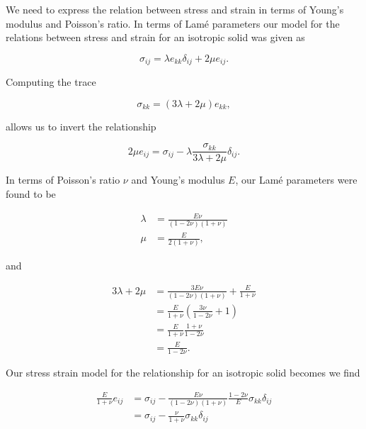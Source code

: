 We need to express the relation between stress and strain in terms of Young's modulus and Poisson's ratio.  In terms of Lam\'e parameters our model for the relations between stress and strain for an isotropic solid was given as

\begin{equation}\label{eqn:continuumProblemSet1:110}
\sigma_{ij} = \lambda e_{kk} \delta_{ij} + 2 \mu e_{ij}.
\end{equation}

Computing the trace

\begin{equation}\label{eqn:continuumProblemSet1:130}
\sigma_{kk} = (3 \lambda + 2 \mu) e_{kk},
\end{equation}

allows us to invert the relationship

\begin{equation}\label{eqn:continuumProblemSet1:150}
2 \mu e_{ij} = \sigma_{ij} - \lambda \frac{\sigma_{kk}}{3 \lambda + 2 \mu} \delta_{ij}.
\end{equation}

In terms of Poisson's ratio $\nu$ and Young's modulus $E$, our Lam\'e parameters were found to be

\begin{align}\label{eqn:continuumProblemSet1:170}
\lambda &= \frac{ E \nu }{(1 - 2 \nu)(1 + \nu)} \\
\mu &= \frac{E}{2(1 + \nu)},
\end{align}

and

\begin{align*}
3 \lambda + 2 \mu
&= \frac{ 3 E \nu }{(1 - 2 \nu)(1 + \nu)} + \frac{E}{1 + \nu} \\
&= \frac{E}{1 + \nu} \left( \frac{3 \nu}{1 - 2 \nu} + 1\right) \\
&= \frac{E}{1 + \nu} \frac{1 + \nu}{1 - 2 \nu} \\
&= \frac{E}{1 - 2 \nu}.
\end{align*}

Our stress strain model for the relationship for an isotropic solid becomes
we find

\begin{align*}
\frac{E}{1 + \nu} e_{ij}
&=
\sigma_{ij}
-
\frac{ E \nu }{(1 - 2 \nu)(1 + \nu)} \frac{1 - 2 \nu}{E}
\sigma_{kk} \delta_{ij} \\
&=
\sigma_{ij}
-
\frac{ \nu }{1 + \nu}
\sigma_{kk} \delta_{ij} \\
\end{align*}

